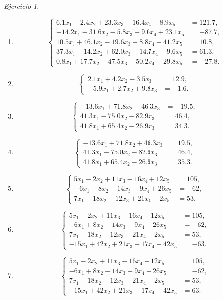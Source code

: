 \documentclass[12pt]{article}
\theoremstyle{remark}
\newtheorem{Ejer}[definicion]{Ejercicio}
\newcommand{\sistema}[1]{%
\[
\left\{
\begin{aligned}
#1
\end{aligned}
\right.
\]
}
\begin{document}
\begin{Ejer}
\begin{enumerate}[resume]
\item \sistema{
6.1x_1-2.4x_2+23.3x_3-16.4x_4-8.9x_5&=121.7,\\
-14.2x_1-31.6x_2-5.8x_3+9.6x_4+23.1x_5&=-87.7,\\
10.5x_1+46.1x_2-19.6x_3-8.8x_4-41.2x_5&=10.8,\\
37.3x_1-14.2x_2+62.0x_3+14.7x_4-9.6x_5&=61.3,\\
0.8x_1+17.7x_2-47.5x_3-50.2x_4+29.8x_5&=-27.8.
}

\item \sistema{
2.1x_1+4.2x_2-3.5x_3&=12.9,\\
-5.9x_1+2.7x_2+9.8x_3&=-1.6.
}

\item \sistema{
-13.6x_1+71.8x_2+46.3x_3&=-19.5,\\
41.3x_1-75.0x_2-82.9x_3&=46.4,\\
41.8x_1+65.4x_2-26.9x_3&=34.3.
}

\item \sistema{
-13.6x_1+71.8x_2+46.3x_3&=19.5,\\
41.3x_1-75.0x_2-82.9x_3&=46.4,\\
41.8x_1+65.4x_2-26.9x_3&=35.3.
}

\item \sistema{
5x_1-2x_2+11x_3-16x_4+12x_5&=105,\\
-6x_1+8x_2-14x_3-9x_4+26x_5&=-62,\\
7x_1-18x_2-12x_3+21x_4-2x_5&=53.
}

\item \sistema{
5x_1-2x_2+11x_3-16x_4+12x_5&=105,\\
-6x_1+8x_2-14x_3-9x_4+26x_5&=-62,\\
7x_1-18x_2-12x_3+21x_4-2x_5&=53,\\
-15x_1+42x_2+21x_3-17x_4+42x_5&=-63.
}

\item \sistema{
5x_1-2x_2+11x_3-16x_4+12x_5&=105,\\
-6x_1+8x_2-14x_3-9x_4+26x_5&=-62,\\
7x_1-18x_2-12x_3+21x_4-2x_5&=53,\\
-15x_1+42x_2+21x_3-17x_4+42x_5&=63.
}

\end{enumerate}
\end{Ejer}
\end{document}
